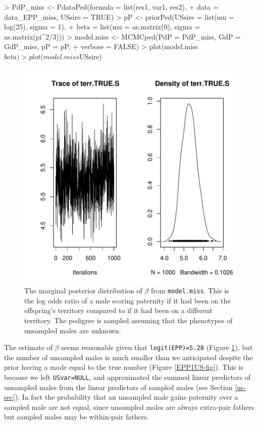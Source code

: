 \documentclass{article}
\begin{document}
\begin{Schunk}
\begin{Sinput}
> PdP_miss <- PdataPed(formula = list(res1, var1, res2), 
+     data = data_EPP_miss, USsire = TRUE)
> pP <- priorPed(USsire = list(mu = log(25), sigma = 1), 
+     beta = list(mu = as.matrix(0), sigma = as.matrix(pi^2/3)))
> model.miss <- MCMCped(PdP = PdP_miss, GdP = GdP_miss, pP = pP, 
+     verbose = FALSE)
> plot(model.miss$beta)
> plot(model.miss$USsire)
\end{Sinput}
\end{Schunk}


\begin{figure}[!h]
\begin{center}
\includegraphics{Tutorial-070}
\end{center}
\caption{The marginal posterior distribution of $\beta$ from \texttt{model.miss}.  This is the log odds ratio of a male scoring paternity if it had been on the offspring's territory compared to if it had been on a different territory. The pedigree is sampled assuming that the phenotypes of unsampled males are unknown.}
\label{EPP1-fig}
\end{figure}


The estimate of $\beta$ seems reasonable given that \texttt{logit(EPP)=5.28} (Figure \ref{EPP1-fig}), but the number of unsampled males is much smaller than we anticipated despite the prior having a mode equal to the true number (Figure \ref{EPP1US-fig}).  This is because we left \texttt{USvar=NULL}, and approximated the summed linear predictors of unsampled males from the linear predictors of sampled males (see Section \ref{us-sec}).  In fact the probability that an unsampled male gains paternity over a sampled male are not equal, since unsampled males are always extra-pair fathers but sampled males may be within-pair fathers.\\  
\end{document}
